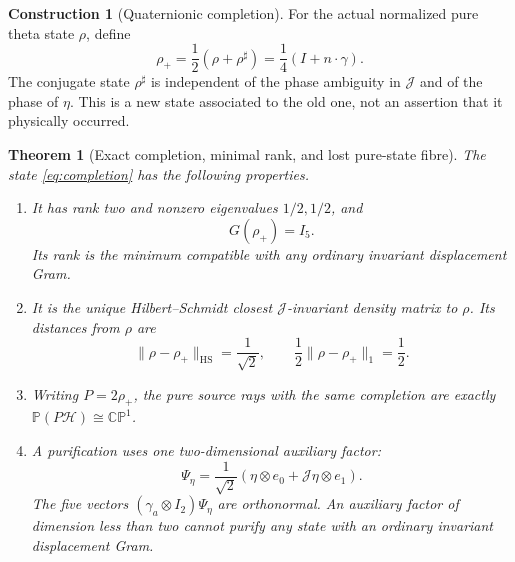 \documentclass[11pt]{article}
\newtheorem{theorem}{Theorem}[section]
\theoremstyle{definition}
\newtheorem{construction}[construction]{Construction}
\theoremstyle{remark}
\newcommand{\HH}{\mathcal H}
\newcommand{\HS}{\mathrm{HS}}
\newcommand{\norm}[1]{\lVert#1\rVert}
\newcommand{\Jq}{\mathcal J}
\begin{document}
\begin{construction}[Quaternionic completion]
\label{con:completion}
For the actual normalized pure theta state $\rho$, define
\begin{equation}
 \rho_+=\frac12(\rho+\rho^\sharp)
        =\frac14(I+n\cdot\gamma).
 \label{eq:completion}
\end{equation}
The conjugate state $\rho^\sharp$ is independent of the phase ambiguity in
$\Jq$ and of the phase of $\eta$. This is a new state associated to the old
one, not an assertion that it physically occurred.
\end{construction}

\begin{theorem}[Exact completion, minimal rank, and lost pure-state fibre]
\label{thm:completion}
The state \eqref{eq:completion} has the following properties.
\begin{enumerate}[label=\textup{(\roman*)},leftmargin=2.7em]
\item It has rank two and nonzero eigenvalues $1/2,1/2$, and
\begin{equation}
 \boxed{G(\rho_+)=I_5.}
 \label{eq:completed-G}
\end{equation}
Its rank is the minimum compatible with any ordinary invariant displacement
Gram.
\item It is the unique Hilbert--Schmidt closest $\Jq$-invariant density
matrix to $\rho$. Its distances from $\rho$ are
\begin{equation}
 \norm{\rho-\rho_+}_{\HS}=\frac1{\sqrt2},\qquad
 \frac12\norm{\rho-\rho_+}_1=\frac12.
 \label{eq:completion-distance}
\end{equation}
\item Writing $P=2\rho_+$, the pure source rays with the same completion are
exactly $\mathbb P(P\HH)\cong\mathbb{CP}^1$.
\item A purification uses one two-dimensional auxiliary factor:
\begin{equation}
 \Psi_\eta=\frac1{\sqrt2}
 (\eta\otimes e_0+\Jq\eta\otimes e_1).
 \label{eq:purification}
\end{equation}
The five vectors $(\gamma_a\otimes I_2)\Psi_\eta$ are orthonormal. An auxiliary
factor of dimension less than two cannot purify any state with an ordinary
invariant displacement Gram.
\end{enumerate}
\end{theorem}
\end{document}
